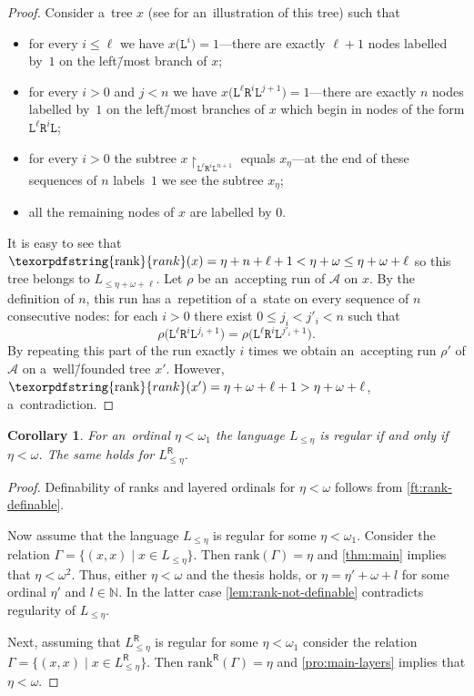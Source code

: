 \documentclass[11pt,a4paper]{amsart}
\theoremstyle{plain}
\newtheorem{cor}[thm]{Corollary}
\theoremstyle{definition}
\theoremstyle{defC}
\theoremstyle{thmC}
\theoremstyle{plain}
\numberwithin{equation}{section}
\numberwithin{equation}{section}
\numberwithin{figure}{section}
\newcommand{\ident}[1]{\ensuremath{\texorpdfstring{\mathrm{\mathnm{#1}}}{#1}}\xspace}
\newcommand{\domain}[1]{\ensuremath{\mathbb{#1}}\xspace}
\newcommand{\N}{\domain{N}}
\newcommand{\mathcalsym}[1]{\ensuremath{\mathcal{#1}}\xspace}
\newcommand{\CA}{\mathcalsym{A}}
\newcommand{\dL}{\mathtt{{\scriptstyle L}}}
\newcommand{\dR}{\mathtt{{\scriptstyle R}}}
\newcommand{\mathnm}[1]{#1}
\newcommand{\restr}{{\upharpoonright}}
\newcommand{\sR}{\mathsf{R}}
\newcommand{\rank}{\ident{rank}}
\newcommand{\limitR}{\mathrm{rank}}
\newcommand{\limitF}{\mathrm{rank}^{\sR}}
\begin{document}
\begin{proof}
	Consider a~tree $x$ (see  for an~illustration of this tree) such that
	\begin{itemize}
	\item for every $i\leq \ell$ we have $x\big(\dL^i\big)=1$---there are exactly $\ell{+}1$ nodes labelled by~$1$ on the left\=/most branch of $x$;
	\item for every $i>0$ and $j<n$ we have $x\big(\dL^{\ell}\dR^i\dL^{j+1}\big)=1$---there are exactly $n$ nodes labelled by~$1$ on the left\=/most branches of $x$ which begin in nodes of the form $\dL^{\ell}\dR^i\dL$;
	\item for every $i>0$ the subtree $x\restr_{\dL^{\ell}\dR^i\dL^{n+1}}$ equals $x_\eta$---at the end of these sequences of $n$ labels~$1$ we see the subtree $x_\eta$;
	\item all the remaining nodes of $x$ are labelled by $0$.
	\end{itemize}
	\noindent %
	It is easy to see that $\rank(x)=\eta+n+\ell+1<\eta+\omega\leq\eta+\omega+\ell$ so this tree belongs to $L_{\leq \eta+\omega+\ell}$.
	Let $\rho$ be an~accepting run of $\CA$ on $x$.
	By the definition of $n$, this run has a~repetition of a~state on every sequence of $n$ consecutive nodes: for each $i>0$ there exist $0\leq j_i<j'_i<n$ such that
	\[\rho\big(\dL^{\ell}\dR^i\dL^{j_i+1}\big)=\rho\big(\dL^{\ell}\dR^i\dL^{j'_i+1}\big).\]
	By repeating this part of the run exactly $i$ times we obtain an~accepting run $\rho'$ of $\CA$ on a~well\=/founded tree $x'$.
	However, $\rank(x')=\eta+\omega+\ell+1>\eta+\omega+\ell$, a~contradiction.
\end{proof}

\begin{cor}\label{cor:not-expressible}
	For an~ordinal $\eta<\omega_1$ the language $L_{\leq\eta}$ is regular if and only if $\eta<\omega$.
	The same holds for $L^{\sR}_{\leq\eta}$.
\end{cor}

\begin{proof}
	Definability of ranks and layered ordinals for $\eta<\omega$ follows from \cref{ft:rank-definable}.

	Now assume that the language $L_{\leq\eta}$ is regular for some $\eta<\omega_1$.
	Consider the relation $\Gamma=\big\{(x,x)\mid x\in L_{\leq\eta}\big\}$.
	Then $\limitR(\Gamma)=\eta$ and \cref{thm:main} implies that $\eta <\omega^2$.
	Thus, either $\eta<\omega$ and the thesis holds, or $\eta=\eta'+\omega+l$ for some ordinal $\eta'$ and $l\in\N$.
	In the latter case \cref{lem:rank-not-definable} contradicts regularity of $L_{\leq\eta}$.

	Next, assuming that $L^{\sR}_{\leq\eta}$ is regular for some $\eta<\omega_1$ consider the relation $\Gamma=\big\{(x,x)\mid x\in L^{\sR}_{\leq\eta}\big\}$.
	Then $\limitF(\Gamma)=\eta$ and \cref{pro:main-layers} implies that $\eta <\omega$.
\end{proof}
\end{document}
